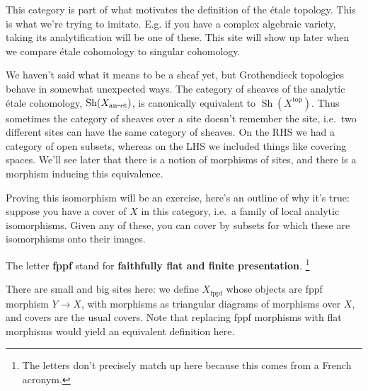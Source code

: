 \begin{remark}

This category is part of what motivates the definition of the étale
topology. This is what we're trying to imitate. E.g. if you have a
complex algebraic variety, taking its analytification will be one of
these. This site will show up later when we compare étale cohomology to
singular cohomology.

\end{remark}

\begin{remark}

We haven't said what it means to be a sheaf yet, but Grothendieck
topologies behave in somewhat unexpected ways. The category of sheaves
of the analytic étale cohomology,
\({\operatorname{Sh}}(X_{\mathrm{an{\hbox{-}}et}})\), is canonically
equivalent to \({\operatorname{Sh}}(X^{\mathrm{top}})\). Thus sometimes
the category of sheaves over a site doesn't remember the site, i.e.~two
different sites can have the same category of sheaves. On the RHS we had
a category of open subsets, whereas on the LHS we included things like
covering spaces. We'll see later that there is a notion of morphisms of
sites, and there is a morphism inducing this equivalence.

Proving this isomorphism will be an exercise, here's an outline of why
it's true: suppose you have a cover of \(X\) in this category, i.e.~a
family of local analytic isomorphisms. Given any of these, you can cover
by subsets for which these are isomorphisms onto their images.

\end{remark}

\begin{definition}[fppf]

The letter \textbf{fppf} stand for \textbf{faithfully flat and finite
presentation}. \footnote{The letters don't precisely match up here
  because this comes from a French acronym.}

\end{definition}

\begin{example}

There are small and big sites here: we define
\(X_{\mathrm{\operatorname{fppf}}}\) whose objects are fppf morphism
\(Y\to X\), with morphisms as triangular diagrams of morphisms over
\(X\), and covers are the usual covers. Note that replacing fppf
morphisms with flat morphisms would yield an equivalent definition here.

\end{example}

